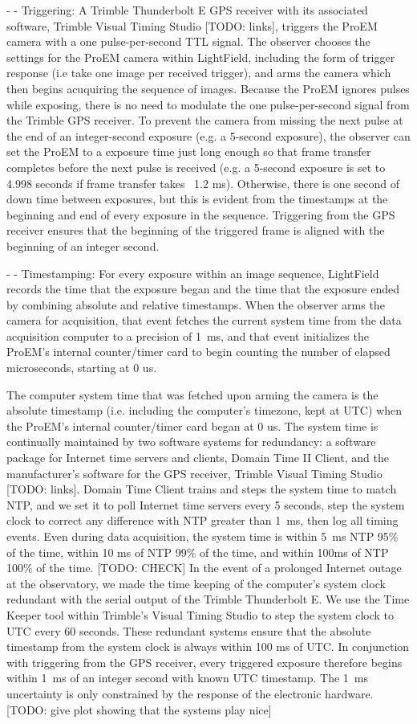 \documentclass[preprint2]{aastex}
\begin{document}
- - Triggering: A Trimble Thunderbolt E GPS receiver with its associated software, Trimble Visual Timing Studio [TODO: links], triggers the ProEM camera with a one pulse-per-second TTL signal. The observer chooses the settings for the ProEM camera within LightField, including the form of trigger response (i.e take one image per received trigger), and arms the camera which then begins acuquiring the sequence of images. Because the ProEM ignores pulses while exposing, there is no need to modulate the one pulse-per-second signal from the Trimble GPS receiver. To prevent the camera from missing the next pulse at the end of an integer-second exposure (e.g. a 5-second exposure), the observer can set the ProEM to a exposure time just long enough so that frame transfer completes before the next pulse is received (e.g. a 5-second exposure is set to 4.998 seconds if frame transfer takes ~1.2 ms). Otherwise, there is one second of down time between exposures, but this is evident from the timestamps at the beginning and end of every exposure in the sequence. Triggering from the GPS receiver ensures that the beginning of the triggered frame is aligned with the beginning of an integer second.

- - Timestamping: For every exposure within an image sequence, LightField records the time that the exposure began and the time that the exposure ended by combining absolute and relative timestamps. When the observer arms the camera for acquisition, that event fetches the current system time from the data acquisition computer to a precision of 1~ms, and that event initializes the ProEM's internal counter/timer card to begin counting the number of elapsed microseconds, starting at 0 us.

The computer system time that was fetched upon arming the camera is the absolute timestamp (i.e. including the computer's timezone, kept at UTC) when the  ProEM's internal counter/timer card began at 0 us. The system time is continually maintained by two software systems for redundancy: a software package for Internet time servers and clients, Domain Time II Client, and the manufacturer's software for the GPS receiver, Trimble Visual Timing Studio [TODO: links]. Domain Time Client trains and steps the system time to match NTP, and we set it to poll Internet time servers every 5 seconds, step the system clock to correct any difference with NTP greater than 1~ms, then log all timing events. Even during data acquisition, the system time is within 5~ms NTP 95\% of the time, within 10 ms of NTP 99\% of the time, and within 100ms of NTP 100\% of the time. [TODO: CHECK] In the event of a prolonged Internet outage at the observatory, we made the time keeping of the computer's system clock redundant with the serial output of the Trimble Thunderbolt E. We use the Time Keeper tool within Trimble's Visual Timing Studio to step the system clock to UTC every 60 seconds. These redundant systems ensure that the absolute timestamp from the system clock is always within 100 ms of UTC. In conjunction with triggering from the GPS receiver, every triggered exposure therefore begins within 1~ms of an integer second with known UTC timestamp. The 1~ms uncertainty is only constrained by the response of the electronic hardware. [TODO: give plot showing that the systems play nice]
\end{document}
